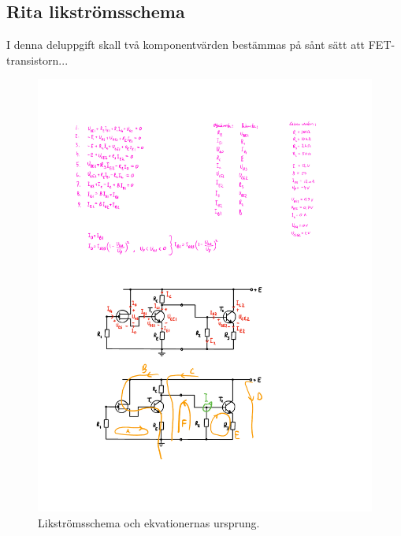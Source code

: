 \subsection{Rita likströmsschema}
I denna deluppgift skall två komponentvärden bestämmas på sånt sätt att FET-transistorn... 

\begin{figure}[h]
\centering
\includegraphics[width=\textwidth]{grafik/g1}
\caption{Likströmsschema och ekvationernas ursprung.}
\label{fig:g1}
\end{figure}

